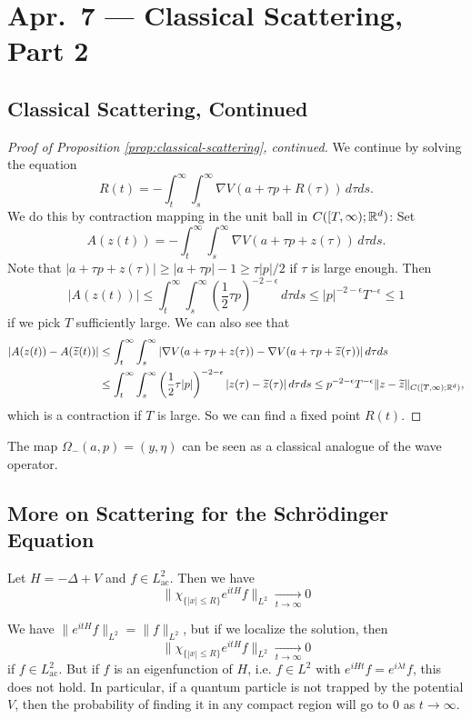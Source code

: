 \chapter{Apr.~7 --- Classical Scattering, Part 2}

\section{Classical Scattering, Continued}

\begin{proof}[Proof of Proposition \ref{prop:classical-scattering}, continued]
  We continue by solving the equation
  \[
    R(t) = -\int_t^\infty \int_s^\infty \nabla V(a + \tau p + R(\tau))\, d\tau ds.
  \]
  We do this by contraction mapping in the
  unit ball in $C([T, \infty); \mathbb{R}^d)$: Set
  \[
    A(z(t))
    = -\int_t^\infty \int_s^\infty \nabla V(a + \tau p + z(\tau))\, d\tau ds.
  \]
  Note that $|a + \tau p + z(\tau)| \ge |a + \tau p| - 1 \ge \tau |p| / 2$
  if $\tau$ is large enough. Then
  \[
    |A(z(t))|
    \le \int_t^\infty \int_s^\infty \left(\frac{1}{2} \tau p\right)^{-2 - \epsilon}\, d\tau ds
    \le |p|^{-2 - \epsilon} T^{-\epsilon} \le 1
  \]
  if we pick $T$ sufficiently large. We can
  also see that
  \begin{align*}
    |A(z(t)) - A(\widetilde{z}(t))|
    &\le \int_t^\infty \int_s^\infty
    |\nabla V(a + \tau p + z(\tau)) - \nabla V(a + \tau p + \widetilde{z}(\tau))|\, d\tau ds \\
    &\le \int_t^\infty \int_s^\infty
    \left(\frac{1}{2} \tau |p|\right)^{-2 - \epsilon}
    |z(\tau) - \widetilde{z}(\tau)|\, d\tau ds
    \le p^{-2 - \epsilon} T^{-\epsilon} \|z - \widetilde{z}\|_{C([T, \infty); \mathbb{R}^d)},
  \end{align*}
  which is a contraction if $T$ is large.
  So we can find a fixed point $R(t)$.
\end{proof}

\begin{remark}
  The map $\Omega_-(a, p) = (y, \eta)$
  can be seen as a classical analogue of the
  wave operator.
\end{remark}

\section{More on Scattering for the Schr\"odinger Equation}
\begin{lemma}\label{lem:local}
  Let $H = -\Delta + V$ and $f \in L^2_{\mathrm{ac}}$.
  Then we have
  \[
    \|\chi_{\{|x| \le R\}} e^{itH} f\|_{L^2} \xrightarrow[t \to \infty]{} 0
  \]
\end{lemma}

\begin{remark}
  We have $\|e^{itH} f\|_{L^2} = \|f\|_{L^2}$,
  but if we localize the solution, then
  \[
    \|\chi_{\{|x| \le R\}} e^{itH} f\|_{L^2} \xrightarrow[t \to \infty]{} 0
  \]
  if $f \in L^2_{\mathrm{ac}}$. But if
  $f$ is an eigenfunction of $H$, i.e.
  $f \in L^2$ with $e^{iH t} f = e^{i\lambda t} f$,
  this does not hold.
  In particular, if a quantum particle is
  not trapped by the potential $V$, then
  the probability of finding it in any
  compact region will go to $0$ as
  $t \to \infty$.
\end{remark}
